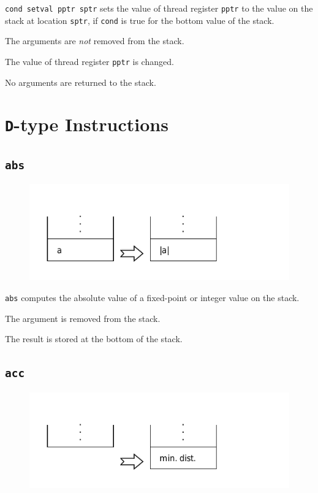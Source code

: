 			\texttt{cond setval pptr sptr} sets the value of thread register
			\texttt{pptr} to the value on the stack at location \texttt{sptr}, 
			if \texttt{cond} is true for the bottom value of the stack.
			
			The arguments are \emph{not} removed from the stack.
			
			The value of thread register \texttt{pptr} is changed.
			
			No arguments are returned to the stack.
	
	\qquad

\section{\texttt{D}-type Instructions}

	\subsection*{\texttt{abs}}
	
		\begin{figure}
			\begin{flushright}
				\includegraphics[width=\linewidth]{figure/pdf/i_abs} 
			\end{flushright}
		\end{figure}
	
			\texttt{abs} computes the absolute value of a fixed-point or
			integer value on the stack.
			
			The argument is removed from the stack.
			
			The result is stored at the bottom of the stack.
	
	\qquad
	
	\subsection*{\texttt{acc}}
	
		\begin{figure}
			\begin{flushright}
				\includegraphics[width=\linewidth]{figure/pdf/i_acc} 
			\end{flushright}
		\end{figure}
	
